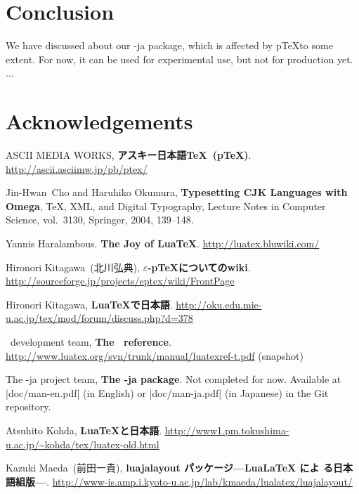 \documentclass{ajt}
\begin{document}
\section{Conclusion}
We have discussed about our \LuaTeX-ja package, which is affected by
p\TeX to some extent. For now, it can be used for experimental use, but
not for production yet. ...

\section*{Acknowledgements}


\providecommand{\bysame}{\leavevmode\hbox to3em{\hrulefill}\thinspace}
\providecommand{\href}[2]{#2}
\begin{thebibliography}{99}

ASCII MEDIA WORKS, \textbf{アスキー日本語\TeX\ (p\TeX)}. \url{http://ascii.asciimw.jp/pb/ptex/}

Jin-Hwan~Cho and Haruhiko Okumura, \textbf{Typesetting CJK Languages with Omega},
\TeX, XML, and Digital Typography, Lecture Notes in Computer Science, vol.~3130,
Springer, 2004, 139--148.

Yannis Haralambous. \textbf{The Joy of LuaTeX}. \url{http://luatex.bluwiki.com/}

Hironori Kitagawa\ (北川弘典), \textbf{$\varepsilon$-p\TeX についてのwiki}.
\url{http://sourceforge.jp/projects/eptex/wiki/FrontPage}

Hironori Kitagawa, \textbf{LuaTeXで日本語}. 
\url{http://oku.edu.mie-u.ac.jp/tex/mod/forum/discuss.php?d=378}

\LuaTeX\ development team, \textbf{The \LuaTeX\ reference}. 
\url{http://www.luatex.org/svn/trunk/manual/luatexref-t.pdf} (snapshot)

The \LuaTeX-ja project team, \textbf{The \LuaTeX-ja package}. 
Not completed for now. Available at |doc/man-en.pdf| (in English) or
	|doc/man-ja.pdf| (in Japanese)
in the Git repository.

Atsuhito Kohda, \textbf{LuaTeXと日本語}.
\url{http://www1.pm.tokushima-u.ac.jp/~kohda/tex/luatex-old.html}

Kazuki Maeda\ (前田一貴), \textbf{luajalayout パッケージ---LuaLaTeX によ
	る日本語組版---}.
\url{http://www-is.amp.i.kyoto-u.ac.jp/lab/kmaeda/lualatex/luajalayout/}


\end{thebibliography}
\end{document}
